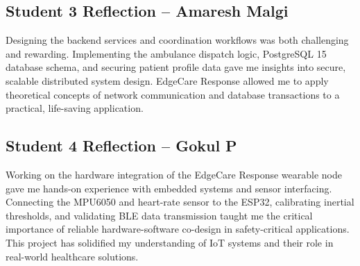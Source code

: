 \subsection{Student 3 Reflection -- Amaresh Malgi}

Designing the backend services and coordination workflows was both challenging and rewarding. Implementing the ambulance dispatch logic, PostgreSQL 15 database schema, and securing patient profile data gave me insights into secure, scalable distributed system design. EdgeCare Response allowed me to apply theoretical concepts of network communication and database transactions to a practical, life-saving application.

\subsection{Student 4 Reflection -- Gokul P}

Working on the hardware integration of the EdgeCare Response wearable node gave me hands-on experience with embedded systems and sensor interfacing. Connecting the MPU6050 and heart-rate sensor to the ESP32, calibrating inertial thresholds, and validating BLE data transmission taught me the critical importance of reliable hardware-software co-design in safety-critical applications. This project has solidified my understanding of IoT systems and their role in real-world healthcare solutions.
